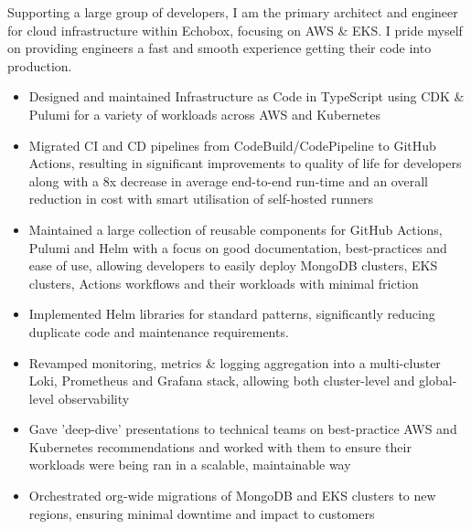 \documentclass[10pt,a4paper,ragged2e]{altacv}
\begin{document}

\begin{fullwidth}
\makecvheader
\end{fullwidth}




Supporting a large group of developers, I am the primary architect and engineer for cloud infrastructure within Echobox, focusing on AWS \& EKS. I pride myself on providing engineers a fast and smooth experience getting their code into production.
\smallskip
\begin{itemize}
  \item Designed and maintained Infrastructure as Code in TypeScript using CDK \& Pulumi for a variety of workloads across AWS and Kubernetes
  \item Migrated CI and CD pipelines from CodeBuild/CodePipeline to GitHub Actions, resulting in significant improvements to quality of life for developers along with a 8x decrease in average end-to-end run-time and an overall reduction in cost with smart utilisation of self-hosted runners
  \item Maintained a large collection of reusable components for GitHub Actions, Pulumi and Helm with a focus on good documentation, best-practices and ease of use, allowing developers to easily deploy MongoDB clusters, EKS clusters, Actions workflows and their workloads with minimal friction
  \item Implemented Helm libraries for standard patterns, significantly reducing duplicate code and maintenance requirements.
  \item Revamped monitoring, metrics \& logging aggregation into a multi-cluster Loki, Prometheus and Grafana stack, allowing both cluster-level and global-level observability
  \item Gave 'deep-dive' presentations to technical teams on best-practice AWS and Kubernetes recommendations and worked with them to ensure their workloads were being ran in a scalable, maintainable way
  \item Orchestrated org-wide migrations of MongoDB and EKS clusters to new regions, ensuring minimal downtime and impact to customers
\end{itemize}
\end{document}
